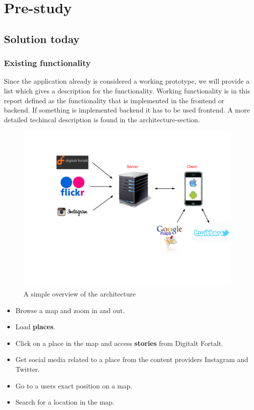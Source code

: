 \section{Pre-study}
\thispagestyle{plain}
	\subsection{Solution today}
		\subsubsection{Existing functionality}
Since the application already is considered a working prototype, we will provide a list which gives a description for the functionality. Working functionality is in this report defined as the functionality that is implemented in the frontend or backend. If something is implemented backend it has to be used frontend. A more detailed techincal description is found in the architecture-section.

\begin{figure}[h!]
\begin{center}
\includegraphics[scale=0.45]{ntoverview-architecture}
\caption{A simple overview of the architecture}
\end{center}
\end{figure}

\begin{itemize}
\item Browse a map and zoom in and out.
\item Load \textbf{places}.
\item Click on a place in the map and access \textbf{stories} from Digitalt Fortalt.
\item Get social media related to a place from the content providers Instagram and Twitter.
\item Go to a users exact position on a map.
\item Search for a location in the map.
\end{itemize}
	
